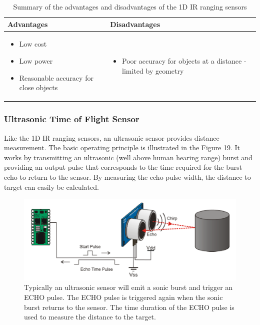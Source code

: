 \documentclass[a4paper]{article}
\begin{document}
\begin{table}
\centering
\caption{Summary of the advantages and disadvantages of the 1D IR ranging sensors} \footnotesize
\begin{tabular}{p{8cm}p{8cm}}
\toprule
\textbf{Advantages} & \textbf{Disadvantages}\\
\midrule
\begin{itemize}[leftmargin=0.3cm] \item Low cost \item Low power \item Reasonable accuracy for close objects \end{itemize} & \begin{itemize}[leftmargin=0.3cm] \item Poor accuracy for objects at a distance - limited by geometry \end{itemize}\\
\bottomrule
\end{tabular}
\end{table}

\subsubsection{Ultrasonic Time of Flight Sensor}
Like the 1D IR ranging sensors, an ultrasonic sensor provides distance measurement. The basic operating principle is illustrated in the Figure 19. It works by transmitting an
ultrasonic (well above human hearing range) burst and providing an output pulse that corresponds to the time required for the burst echo to return to the sensor. By measuring the echo pulse width, the distance to target can easily be calculated.

\begin{figure}[h]
\centering
\includegraphics[scale=0.2]{ultrasonic_tof}
\caption{Typically an ultrasonic sensor will emit a sonic burst and trigger an ECHO pulse. The ECHO pulse is triggered again when the sonic burst returns to the sensor. The time duration of the ECHO pulse is used to measure the distance to the target.}
\end{figure}
\end{document}

